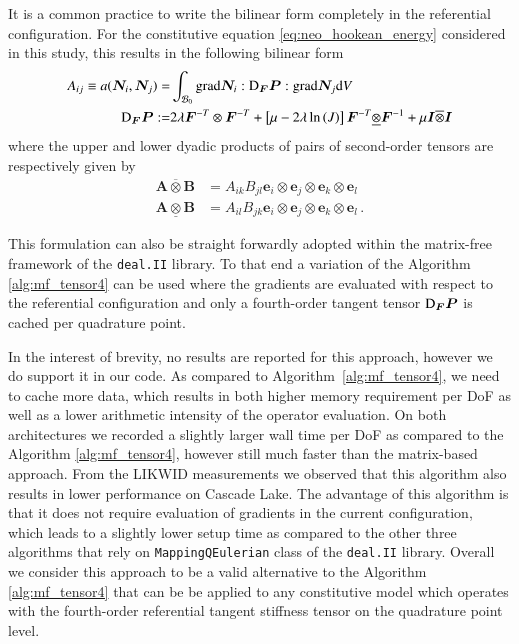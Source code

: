 \documentclass[AMA,STIX1COL]{WileyNJD-v2}
\newcommand*{\gz}[1]{\boldsymbol{#1}}
\newcommand*{\grad}{\mathrm{grad}}
\renewcommand*{\d}{\mathrm{d}}
\newcommand*{\mcl}[1]{\mathcal{#1}}
\begin{document}
It is a common practice to write the bilinear form completely in the referential configuration.
For the constitutive equation \eqref{eq:neo_hookean_energy} considered in this study, this results in the following bilinear form
\begin{align}
  A_{ij} \equiv a(\gz N_i, \gz N_j) =&
  \int_{\mcl B_0}
  \grad \gz N_i : {\rm D}_{\gz F}{\gz P} : \grad \gz N_j
  \d V
  \label{eq:algebraic_tangent_dPdF}
  \\
  {\rm D}_{\gz F}{\gz P} :=&
  2 \lambda
  \gz F^{-T} \otimes \gz F^{-T}
  +
  \left[\mu - 2 \lambda \ln\left( J \right) \right]
  \gz F^{-T} \underline{\otimes} \gz F^{-1}
  +
  \mu \gz I \overline{\otimes} \gz I
\end{align}
where the upper and lower dyadic products of pairs of second-order tensors are respectively given by
\begin{align*}
    \gz A \overline{\otimes} \gz B &= A_{ik} B_{jl} \gz e_i \otimes \gz e_j \otimes \gz e_k \otimes \gz e_l \\
    \gz A \underline{\otimes} \gz B &= A_{il} B_{jk} \gz e_i \otimes \gz e_j \otimes \gz e_k \otimes \gz e_l  \, .
\end{align*}

This formulation can also be straight forwardly adopted within the matrix-free framework of the \texttt{deal.II} library.
To that end a variation of the Algorithm \ref{alg:mf_tensor4} can be used where the gradients are evaluated with respect to the referential configuration
and only a fourth-order tangent tensor ${\rm D}_{\gz F}{\gz P}$ is cached per quadrature point.

In the interest of brevity, no results are reported for this approach,
however we do support it in our code.
As compared to Algorithm~\ref{alg:mf_tensor4}, we need to cache more data, which results in both higher memory requirement per DoF
as well as a lower arithmetic intensity of the operator evaluation.
On both architectures we recorded a slightly larger wall time per DoF as compared to the Algorithm \ref{alg:mf_tensor4},
however still much faster than the matrix-based approach.
From the LIKWID measurements we observed that this algorithm also results in lower performance on Cascade Lake.
The advantage of this algorithm is that it does not require evaluation of gradients in the current configuration, which leads to a slightly lower setup time
as compared to the other three algorithms that rely on \texttt{MappingQEulerian} class of the \texttt{deal.II} library.
Overall we consider this approach to be a valid alternative to the Algorithm \ref{alg:mf_tensor4}
that can be be applied to any constitutive model which operates with the fourth-order referential tangent stiffness tensor on the quadrature point level.
\end{document}
